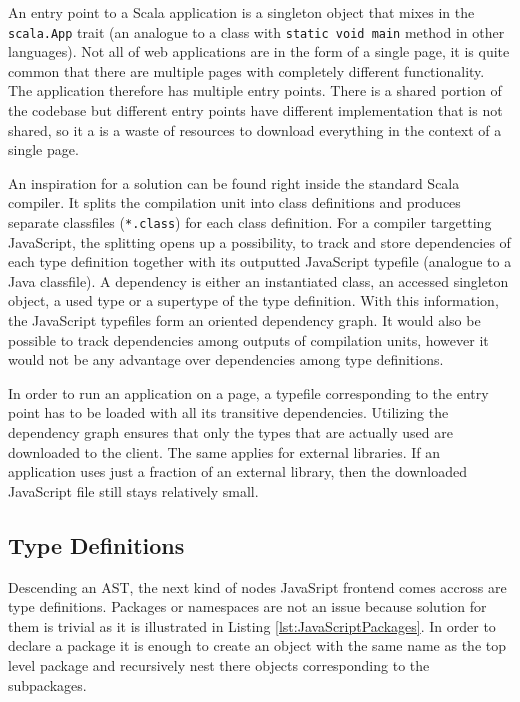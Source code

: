 \documentclass[12pt,a4paper]{report}
\begin{document}
An entry point to a Scala application is a singleton object that mixes in the \texttt{scala.App} trait (an analogue to a class with \texttt{static void main} method in other languages). Not all of web applications are in the form of a single page, it is quite common that there are multiple pages with completely different functionality. The application therefore has multiple entry points. There is a shared portion of the codebase but different entry points have different implementation that is not shared, so it a is a waste of resources to download everything in the context of a single page.

An inspiration for a solution can be found right inside the standard Scala compiler. It splits the compilation unit into class definitions and produces separate classfiles (\texttt{*.class}) for each class definition. For a compiler targetting JavaScript, the splitting opens up a possibility, to track and store dependencies of each type definition together with its outputted JavaScript typefile (analogue to a Java classfile). A dependency is either an instantiated class, an accessed singleton object, a used type or a supertype of the type definition. With this information, the JavaScript typefiles form an oriented dependency graph. It would also be possible to track dependencies among outputs of compilation units, however it would not be any advantage over dependencies among type definitions.

In order to run an application on a page, a typefile corresponding to the entry point has to be loaded with all its transitive dependencies. Utilizing the dependency graph ensures that only the types that are actually used are downloaded to the client. The same applies for external libraries. If an application uses just a fraction of an external library, then the downloaded JavaScript file still stays relatively small.

\subsection{Type Definitions}

Descending an AST, the next kind of nodes JavaSript frontend comes accross are type definitions. Packages or namespaces are not an issue because solution for them is trivial as it is illustrated in Listing \ref{lst:JavaScriptPackages}. In order to declare a package it is enough to create an object with the same name as the top level package and recursively nest there objects corresponding to the subpackages.
\end{document}

